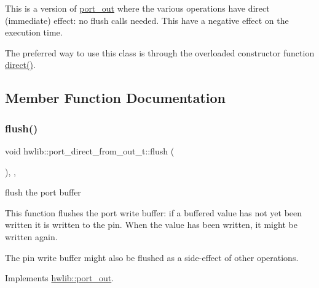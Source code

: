 This is a version of \hyperlink{classhwlib_1_1port__out}{port\+\_\+out} where the various operations have direct (immediate) effect\+: no flush calls needed. This have a negative effect on the execution time.

The preferred way to use this class is through the overloaded constructor function \hyperlink{namespacehwlib_a43941b7f246ad934ee43dbfa0f5c8b5a}{direct()}. 

\subsection{Member Function Documentation}
\mbox{\label{classhwlib_1_1port__direct__from__out__t_a6fab0d2c9bdf82590bd385bbaadf6bc3}} 
\subsubsection{\texorpdfstring{flush()}{flush()}}
{\footnotesize\ttfamily void hwlib\+::port\+\_\+direct\+\_\+from\+\_\+out\+\_\+t\+::flush (\begin{DoxyParamCaption}{ }\end{DoxyParamCaption})\hspace{0.3cm}{\ttfamily [inline]}, {\ttfamily [override]}, {\ttfamily [virtual]}}





flush the port buffer

This function flushes the port write buffer\+: if a buffered value has not yet been written it is written to the pin. When the value has been written, it might be written again.

The pin write buffer might also be flushed as a side-\/effect of other operations. 

Implements \hyperlink{classhwlib_1_1port__out_aff7c8d768ec0b7f3d738a47ef1a4bbfe}{hwlib\+::port\+\_\+out}.

\mbox{\label{classhwlib_1_1port__direct__from__out__t_a3204fe9520fd12fcb155362e22629443}} 
